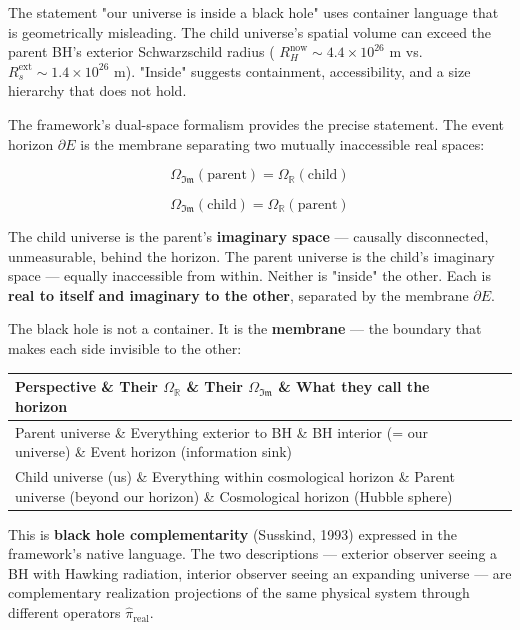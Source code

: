 \documentclass[11pt,a4paper]{article}
\theoremstyle{definition}\newtheorem{definition}{Definition}
\theoremstyle{remark}\newtheorem{remark}{Remark}
\begin{document}
The statement "our universe is inside a black hole" uses container language that is geometrically misleading. The child universe's spatial volume can exceed the parent BH's exterior Schwarzschild radius ( $R_H^{\text{now}} \sim 4.4 \times 10^{26}$ m vs. $R_s^{\text{ext}} \sim 1.4 \times 10^{26}$ m). "Inside" suggests containment, accessibility, and a size hierarchy that does not hold.

The framework's dual-space formalism provides the precise statement. The event horizon $\partial E$ is the membrane separating two mutually inaccessible real spaces:


\begin{equation}
\boxed{\Omega_{\mathfrak{Im}}(\text{parent}) = \Omega_{\mathbb{R}}(\text{child})}
\end{equation}



\begin{equation}
\boxed{\Omega_{\mathfrak{Im}}(\text{child}) = \Omega_{\mathbb{R}}(\text{parent})}
\end{equation}


The child universe is the parent's \textbf{imaginary space} — causally disconnected, unmeasurable, behind the horizon. The parent universe is the child's imaginary space — equally inaccessible from within. Neither is "inside" the other. Each is \textbf{real to itself and imaginary to the other}, separated by the membrane $\partial E$.

The black hole is not a container. It is the \textbf{membrane} — the boundary that makes each side invisible to the other:

\begin{longtable}{llll}
\hline
Perspective \& Their $\Omega_{\mathbb{R}}$ \& Their $\Omega_{\mathfrak{Im}}$ \& What they call the horizon \\
\hline
Parent universe \& Everything exterior to BH \& BH interior (= our universe) \& Event horizon (information sink) \\
Child universe (us) \& Everything within cosmological horizon \& Parent universe (beyond our horizon) \& Cosmological horizon (Hubble sphere) \\
\hline
\end{longtable}
This is \textbf{black hole complementarity} (Susskind, 1993) expressed in the framework's native language. The two descriptions — exterior observer seeing a BH with Hawking radiation, interior observer seeing an expanding universe — are complementary realization projections of the same physical system through different operators $\hat{\pi}_{\text{real}}$.
\end{document}
